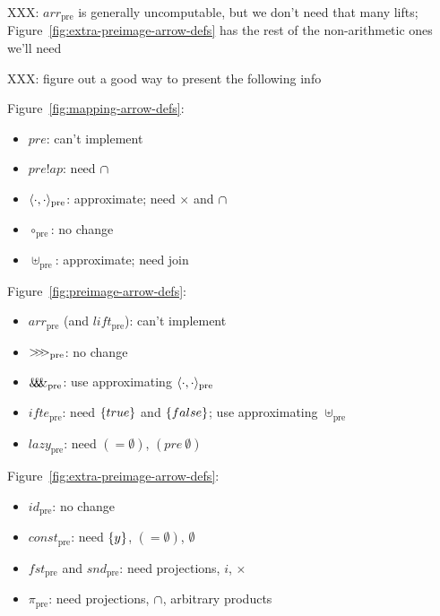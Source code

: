 \documentclass[preprint]{sigplanconf}
\newcommand{\arrowlift}{\ensuremath{lift}}
\newcommand{\arrowarr}{\ensuremath{arr}}
\newcommand{\arrowcomp}{\ensuremath{{>}\mspace{-6mu}{>}\mspace{-6mu}{>}}}
\newcommand{\arrowpair}{\ensuremath{\mathit{\&\mspace{-7.5mu}\&\mspace{-7.5mu}\&}}}
\newcommand{\arrowif}{\ensuremath{ifte}}
\newcommand{\arrowlazy}{\ensuremath{lazy}}
\newcommand{\pre}{_\mathrm{pre}}
\newcommand{\liftpre}{\arrowlift\pre}
\newcommand{\arrpre}{\arrowarr\pre}
\newcommand{\comppre}{\arrowcomp\pre}
\newcommand{\pairpre}{\arrowpair\pre}
\newcommand{\ifpre}{\arrowif\pre}
\newcommand{\lazypre}{\arrowlazy\pre}
\begin{document}
XXX: $\arrpre$ is generally uncomputable, but we don't need that many lifts; Figure~\ref{fig:extra-preimage-arrow-defs} has the rest of the non-arithmetic ones we'll need

XXX: figure out a good way to present the following info

Figure~\ref{fig:mapping-arrow-defs}:
\begin{itemize}
	\item $pre$: can't implement
	\item $pre!ap$: need $\cap$
	\item $\pair{\cdot,\cdot}\pre$: approximate; need $\times$ and $\cap$
	\item $\circ\pre$: no change
	\item $\uplus\pre$: approximate; need join
\end{itemize}

Figure~\ref{fig:preimage-arrow-defs}:
\begin{itemize}
	\item $\arrpre$ (and $\liftpre$): can't implement
	\item $\comppre$: no change
	\item $\pairpre$: use approximating $\pair{\cdot,\cdot}\pre$
	\item $\ifpre$: need $\{{true}\}$ and $\{{false}\}$; use approximating $\uplus\pre$
	\item $\lazypre$: need $(= \emptyset)$, $(pre~\emptyset)$
\end{itemize}

Figure~\ref{fig:extra-preimage-arrow-defs}:
\begin{itemize}
	\item $id\pre$: no change
	\item $const\pre$: need $\{{y}\}$, $(= \emptyset)$, $\emptyset$
	\item $fst\pre$ and $snd\pre$: need projections, $i$, $\times$
	\item $\pi\pre$: need projections, $\cap$, arbitrary products
\end{itemize}









\end{document}
